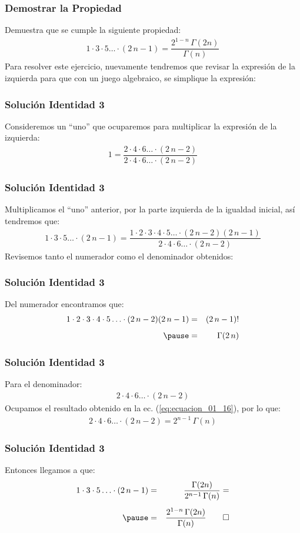 \documentclass[12pt]{beamer}
\begin{document}
\begin{frame}
\frametitle{Demostrar la Propiedad}
Demuestra que se cumple la siguiente propiedad:
\pause
\begin{align*}
1 \cdot 3 \cdot 5 \ldots \cdot (2 \, n - 1) = \dfrac{2^{1-n} \, \Gamma (2 n)}{\Gamma (n)}
\end{align*}
\pause
Para resolver este ejercicio, nuevamente tendremos que revisar la expresión de la izquierda para que con un juego algebraico, se simplique la expresión:
\end{frame}
\begin{frame}
\frametitle{Solución Identidad 3}
Consideremos un \enquote{uno} que ocuparemos para multiplicar la expresión de la izquierda:
\pause
\begin{align*}
1 = \dfrac{ 2 \cdot 4 \cdot 6 \ldots \cdot (2 \, n - 2)}{ 2 \cdot 4 \cdot 6 \ldots \cdot (2 \, n - 2)}
\end{align*}
\end{frame}
\begin{frame}
\frametitle{Solución Identidad 3}
Multiplicamos el \enquote{uno} anterior, por la parte izquierda de la igualdad inicial, así tendremos que:
\pause
{\fontsize{12}{12}\selectfont
\begin{align*}
1 \cdot 3 \cdot 5 \ldots \cdot (2 \, n - 1) = \dfrac{1 \cdot 2 \cdot 3 \cdot 4 \cdot 5 \ldots \cdot (2 \, n - 2)(2 \, n -1)}{2 \cdot 4 \cdot 6 \ldots \cdot (2 \, n - 2)}
\end{align*}}
\pause
Revisemos tanto el numerador como el denominador obtenidos:
\end{frame}
\begin{frame}
\frametitle{Solución Identidad 3}
Del numerador encontramos que:
\pause
\begin{eqnarray*}
1 \cdot 2 \cdot 3 \cdot 4 \cdot 5 \ldots \cdot (2 \, n - 2)(2 \, n -1) &=& (2 \, n - 1)! \\[0.5em] \pause
&=& \Gamma (2 \, n)
\end{eqnarray*}
\end{frame}
\begin{frame}
\frametitle{Solución Identidad 3}
Para el denominador:
\pause
\begin{align*}
2 \cdot 4 \cdot 6 \ldots \cdot (2 \, n - 2)
\end{align*}
\pause
Ocupamos el resultado obtenido en la ec. (\ref{eq:ecuacion_01_16}), por lo que:
\pause
\begin{align*}
2 \cdot 4 \cdot 6 \ldots \cdot (2 \, n - 2) = 2^{n-1} \, \Gamma (n)
\end{align*}
\end{frame}
\begin{frame}
\frametitle{Solución Identidad 3}
Entonces llegamos a que:
\pause
\begin{eqnarray*}
1 \cdot 3 \cdot 5 \ldots \cdot (2 \, n - 1) &=& \dfrac{\Gamma (2 n)}{2^{n-1} \, \Gamma (n)} = \\[0.5em] \pause
&=& \dfrac{2^{1-n} \, \Gamma(2n)}{\Gamma (n)} \qed
\end{eqnarray*}
\end{frame}
\end{document}
